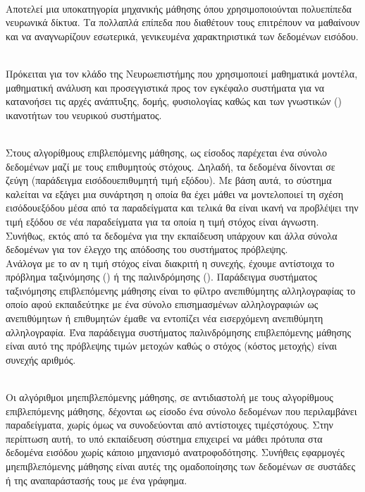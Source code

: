 \begin{description}
    \item[Βαθιά Μάθηση] \hfill \\ Αποτελεί μια υποκατηγορία μηχανικής μάθησης όπου χρησιμοποιούνται πολυεπίπεδα νευρωνικά δίκτυα. Τα πολλαπλά επίπεδα που διαθέτουν τους επιτρέπουν να μαθαίνουν και να αναγνωρίζουν εσωτερικά, γενικευμένα χαρακτηριστικά των δεδομένων εισόδου.
    \hypertarget{_computational_neuroscience}{
    \item[Υπολογιστική Νευροεπιστήμη (\en{Computational Neuroscience})]} \hfill \\Πρόκειται για τον κλάδο της Νευρωεπιστήμης που χρησιμοποιεί μαθηματικά μοντέλα, μαθηματική ανάλυση και προσεγγιστικά προς τον εγκέφαλο συστήματα για να κατανοήσει τις αρχές ανάπτυξης, δομής, φυσιολογίας καθώς και των γνωστικών () ικανοτήτων του νευρικού συστήματος.
    \item[Επιβλεπόμενη Μάθηση] \hfill \\ Στους αλγορίθμους επιβλεπόμενης μάθησης, ως είσοδος παρέχεται ένα σύνολο δεδομένων μαζί με τους επιθυμητούς στόχους. Δηλαδή, τα δεδομένα δίνονται σε ζεύγη (παράδειγμα εισόδου\textemdash επιθυμητή τιμή εξόδου). Με βάση αυτά, το σύστημα καλείται να εξάγει μια συνάρτηση η οποία θα έχει μάθει να μοντελοποιεί τη σχέση εισόδου\textendash εξόδου μέσα από τα παραδείγματα και τελικά θα είναι ικανή να προβλέψει την τιμή εξόδου σε νέα παραδείγματα για τα οποία η τιμή στόχος είναι άγνωστη. Συνήθως, εκτός από τα δεδομένα για την εκπαίδευση υπάρχουν και άλλα σύνολα δεδομένων για τον έλεγχο της απόδοσης του συστήματος πρόβλεψης.\\
    Ανάλογα με το αν η τιμή στόχος είναι διακριτή η συνεχής, έχουμε αντίστοιχα το πρόβλημα ταξινόμησης () ή της παλινδρόμησης (). Παράδειγμα συστήματος ταξινόμησης επιβλεπόμενης μάθησης είναι το φίλτρο ανεπιθύμητης αλληλογραφίας το οποίο αφού εκπαιδεύτηκε με ένα σύνολο επισημασμένων αλληλογραφιών ως ανεπιθύμητων ή επιθυμητών έμαθε να εντοπίζει νέα εισερχόμενη ανεπιθύμητη αλληλογραφία. Ένα παράδειγμα συστήματος παλινδρόμησης επιβλεπόμενης μάθησης είναι αυτό της πρόβλεψης τιμών μετοχών καθώς ο στόχος (κόστος μετοχής) είναι συνεχής αριθμός.
    \item[Μη-επιβλεπόμενη Μάθηση] \hfill \\ Οι αλγόριθμοι μη\textendash επιβλεπόμενης μάθησης, σε αντιδιαστολή με τους αλγορίθμους επιβλεπόμενης μάθησης, δέχονται ως είσοδο ένα σύνολο δεδομένων που περιλαμβάνει παραδείγματα, χωρίς όμως να συνοδεύονται από αντίστοιχες τιμές\textendash στόχους. Στην περίπτωση αυτή, το υπό εκπαίδευση σύστημα επιχειρεί να μάθει πρότυπα στα δεδομένα εισόδου χωρίς κάποιο μηχανισμό ανατροφοδότησης. Συνήθεις εφαρμογές μη\textendash επιβλεπόμενης μάθησης είναι αυτές της ομαδοποίησης των δεδομένων σε συστάδες ή της αναπαράστασής τους με ένα γράφημα.
    

\end{description}
